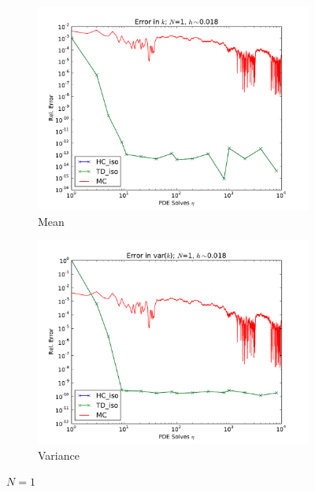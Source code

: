 \documentclass[11pt]{article}
\begin{document}
\begin{figure}[H]
\centering
  \begin{subfigure}[b]{0.49 \textwidth}
   \includegraphics[width=\textwidth]{N1_h5_MCHC}
   \caption{Mean}
   \label{n1mean}
  \end{subfigure}
  \begin{subfigure}[b]{0.49 \textwidth}
   \includegraphics[width=\textwidth]{N1_h5_MCHC_2}
   \caption{Variance}
   \label{n1var}
  \end{subfigure}
  \caption{$N=1$}
  \label{n1}
\end{figure}
\end{document}
